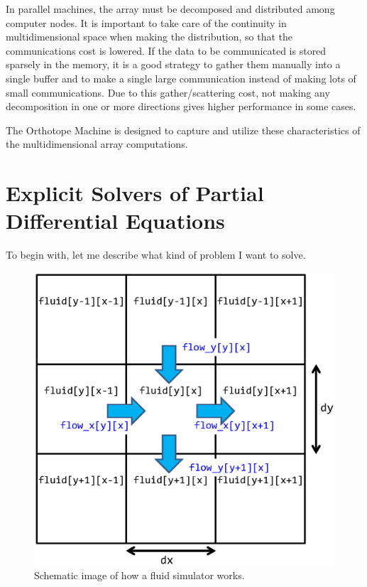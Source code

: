\documentclass[twocolumn]{article}
\begin{document}
In parallel machines, the array must be decomposed and distributed among
computer nodes. It is important to take care of the continuity in
multidimensional space when making the distribution, so that the
communications cost is lowered. If the data to be communicated is stored
sparsely in the memory, it is a good strategy to gather them manually into a
single buffer and to make a single large communication instead of making lots
of small communications. Due to this gather/scattering cost, not making any
decomposition in one or more directions gives higher performance in some
cases.

The Orthotope Machine is designed to capture and utilize these
characteristics of the multidimensional array computations.

\section{Explicit Solvers of Partial Differential Equations}

To begin with, let me describe what kind of problem I want to solve.

\begin{figure}
  \includegraphics[scale=0.5]{figure/fluid.eps}
  \caption {Schematic image of how a fluid simulator
    works. }\label{FigureFluidScheme}
\end{figure}
\end{document}
